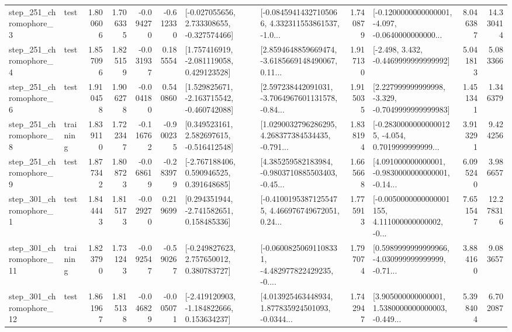 \begin{tabular}{llrrrrllrlrr}
   step\_251\_chromophore\_3 &      test &      1.800606 &    1.706335 &     -0.094270 & -0.612330 &   [-0.027055656, 2.733308655, -0.327574466] &  [-0.08459414327105066, 4.332311553861537, -1.0... &       1.740879 &  [-0.1200000000000001, -4.097, -0.0640000000000... &            8.046387 &         14.330414 \\
   step\_251\_chromophore\_4 &      test &      1.857096 &    1.825159 &     -0.031937 &  0.185554 &    [1.757416919, -2.081119058, 0.429123528] &  [2.8594648859669474, -3.6185669148490067, 0.11... &       1.917130 &               [-2.498, 3.432, -0.4469999999999992] &            5.041813 &          5.083366 \\
   step\_251\_chromophore\_6 &      test &      1.910458 &    1.906278 &     -0.004180 &  0.540860 &   [1.529825671, -2.163715542, -0.460742088] &  [2.597238442091031, -3.7064967601131578, -0.84... &       1.915035 &   [2.227999999999998, -3.329, -0.7049999999999983] &            1.451341 &          1.346379 \\
   step\_251\_chromophore\_8 &  training &      1.839110 &    1.722347 &     -0.116762 & -0.900235 &    [0.349523161, 2.582697615, -0.516412548] &  [1.0290032796286295, 4.268377384534435, -0.791... &       1.838194 &  [-0.28300000000000125, -4.054, 0.7019999999999... &            3.913291 &          9.424256 \\
   step\_251\_chromophore\_9 &      test &      1.877342 &    1.808723 &     -0.068619 & -0.283979 &    [-2.767188406, 0.590946525, 0.391648685] &  [4.385259582183984, -0.9803710885503403, -0.45... &       1.665668 &  [4.091000000000001, -0.9830000000000001, -0.14... &            6.095240 &          3.986657 \\
   step\_301\_chromophore\_1 &      test &      1.844443 &    1.815173 &     -0.029270 &  0.219699 &    [0.294351944, -2.741582651, 0.158485336] &  [-0.41001953871255475, 4.466976749672051, 0.24... &       1.775913 &  [-0.0050000000000001155, 4.111000000000002, -0... &            7.651547 &         12.278316 \\
  step\_301\_chromophore\_11 &  training &      1.823790 &    1.731243 &     -0.092547 & -0.590267 &    [-0.249827623, 2.757650012, 0.380783727] &  [-0.06008250691108331, -4.482977822429235, -0.... &       1.797074 &  [0.5989999999999966, -4.030999999999999, -0.71... &            3.884160 &          9.083657 \\
  step\_301\_chromophore\_12 &      test &      1.861967 &    1.815138 &     -0.046829 & -0.005071 &   [-2.419120903, -1.184822666, 0.153634237] &  [4.013925463448934, 1.877835924501093, -0.0344... &       1.742947 &  [3.905000000000001, 1.5380000000000003, -0.449... &            5.398404 &          6.702087 \\

\end{tabular}
